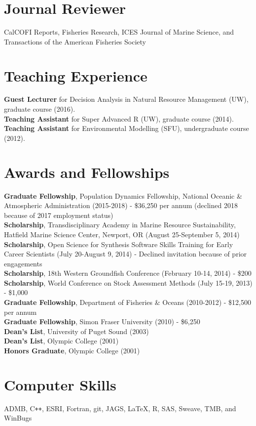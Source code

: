 \documentclass[10pt]{article}
\begin{document}
\section*{Journal Reviewer}
\noindent CalCOFI Reports, Fisheries Research, ICES Journal of Marine Science, and Transactions of the American Fisheries Society

\section*{Teaching Experience}
\textbf{Guest Lecturer} for Decision Analysis in Natural Resource Management (UW), graduate course (2016).\\
\textbf{Teaching Assistant} for Super Advanced R (UW), graduate course (2014). \\
\noindent
\textbf{Teaching Assistant} for Environmental Modelling (SFU), undergraduate course (2012).

\section*{Awards and Fellowships}
\textbf{Graduate Fellowship}, Population Dynamics Fellowship, National Oceanic \& Atmospheric Administration (2015-2018) - \$36,250 per annum (declined 2018 because of 2017 employment status) \\
\textbf{Scholarship}, Transdisciplinary Academy in Marine Resource Sustainability, Hatfield Marine Science Center, Newport, OR (August 25-September 5, 2014) \\
\textbf{Scholarship}, Open Science for Synthesis Software Skills Training for Early Career Scientists (July 20-August 9, 2014) - Declined invitation because of prior engagements \\
\textbf{Scholarship}, 18th Western Groundfish Conference (February 10-14, 2014) - \$200 \\
\textbf{Scholarship}, World Conference on Stock Assessment Methods (July 15-19, 2013) - \$1,000 \\
\textbf{Graduate Fellowship}, Department of Fisheries \& Oceans (2010-2012) - \$12,500 per annum \\
\textbf{Graduate Fellowship}, Simon Fraser University (2010) - \$6,250 \\
\textbf{Dean's List}, University of Puget Sound (2003) \\
\textbf{Dean's List}, Olympic College (2001) \\
\textbf{Honors Graduate}, Olympic College (2001)

\section*{Computer Skills}
ADMB, C\texttt{++}, ESRI, Fortran, git, JAGS, \LaTeX, R, SAS, Sweave, TMB, and WinBugs

\end{document}
